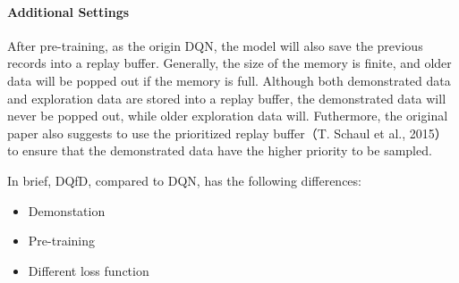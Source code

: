 \documentclass{article}
\begin{document}
\paragraph{Additional Settings} After pre-training, as the origin DQN, the model will also save the previous records into a replay buffer. Generally, the size of the memory is finite, and older data will be popped out if the memory is full. Although both demonstrated data and exploration data are stored into a replay buffer, the demonstrated data will never be popped out, while older exploration data will. Futhermore, the original paper also suggests to use the prioritized replay buffer（T. Schaul et al., 2015） \cite{DBLP:journals/corr/SchaulQAS15} to ensure that the demonstrated data have the higher priority to be sampled. \par
In brief, DQfD, compared to DQN, has the following differences:
\begin{itemize}
    \item Demonstation
    \item Pre-training
    \item Different loss function
\end{itemize}
\end{document}
